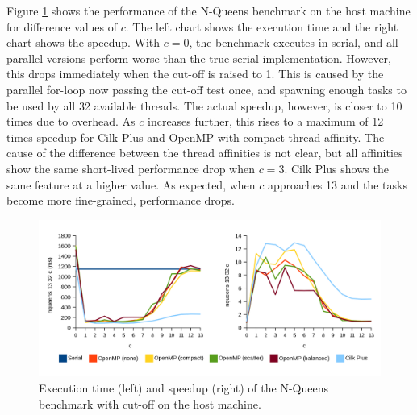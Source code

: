 \documentclass{report}
\begin{document}
Figure \ref{Fig:nqueenscutoffhost} shows the performance of the N-Queens benchmark on the host machine for difference values of \(c\). The left chart shows the execution time and the right chart shows the speedup. With \(c=0\), the benchmark executes in serial, and all parallel versions perform worse than the true serial implementation. However, this drops immediately when the cut-off is raised to 1. This is caused by the parallel for-loop now passing the cut-off test once, and spawning enough tasks to be used by all 32 available threads. The actual speedup, however, is closer to 10 times due to overhead. As \(c\) increases further, this rises to a maximum of 12 times speedup for Cilk Plus and OpenMP with compact thread affinity. The cause of the difference between the thread affinities is not clear, but all affinities show the same short-lived performance drop when \(c=3\). Cilk Plus shows the same feature at a higher value. As expected, when \(c\) approaches 13 and the tasks become more fine-grained, performance drops.
\noindent
\begin{figure}[t!]
	\includegraphics[width=\linewidth]{../../charts/intel64/nqueens_cutoff}
	\caption{Execution time (left) and speedup (right) of the N-Queens benchmark with cut-off on the host machine.}
	\label{Fig:nqueenscutoffhost}
\end{figure}
\end{document}
